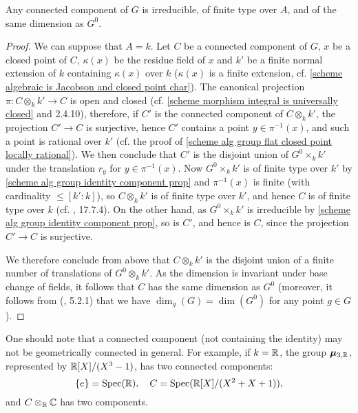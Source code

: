 \begin{corollary}\label{scheme alg group connected component prop}
Any connected component of $G$ is irreducible, of finite type over $A$, and of the same dimension as $G^0$.
\end{corollary}
\begin{proof}
We can suppose that $A=k$. Let $C$ be a connected component of $G$, $x$ be a closed point of $C$, $\kappa(x)$ be the residue field of $x$ and $k'$ be a finite normal extension of $k$ containing $\kappa(x)$ over $k$ ($\kappa(x)$ is a finite extension, cf. \cref{scheme algebraic is Jacobson and closed point char}). The canonical projection $\pi:C\otimes_kk'\to C$ is open and closed (cf. \cref{scheme morphism integral is universally closed} and \cite{EGA4-2} 2.4.10), therefore, if $C'$ is the connected component of $C\otimes_kk'$, the projection $C'\to C$ is  surjective, hence $C'$ contains a point $y\in\pi^{-1}(x)$, and such a point is rational over $k'$ (cf. the proof of \cref{scheme alg group flat closed point locally rational}). We then conclude that $C'$ is the disjoint union of $G^0\times_kk'$ under the translation $r_y$ for $y\in\pi^{-1}(x)$. Now $G^0\times_kk'$ is of finite type over $k'$ by \cref{scheme alg group identity component prop} and $\pi^{-1}(x)$ is finite (with cardinality $\leq[k':k]$), so $C\otimes_kk'$ is of finite type over $k'$, and hence $C$ is of finite type over $k$ (cf. \cite{EGA4-4}, 17.7.4). On the other hand, as $G^0\times_kk'$ is irreducible by \cref{scheme alg group identity component prop}, so is $C'$, and hence is $C$, since the projection $C'\to C$ is surjective.\par
We therefore conclude from above that $C\otimes_kk'$ is the disjoint union of a finite number of translations of $G^0\otimes_kk'$. As the dimension is invariant under base change of fields, it follows that $C$ has the same dimension as $G^0$ (moreover, it follows from (\cite{EGA4-2}, 5.2.1) that we have $\dim_g(G)=\dim(G^0)$ for any point $g\in G$).
\end{proof}

\begin{example}\label{scheme A-group connected component not geometrically irreducible example}
One should note that a connected component (not containing the identity) may not be geometrically connected in general. For example, if $k=\mathbb{R}$, the group $\bm{\mu}_{3,\mathbb{R}}$, represented by $\mathbb{R}[X]/(X^3-1)$, has two connected components:
\[\{e\}=\mathrm{Spec}(\mathbb{R}),\quad C=\mathrm{Spec}(\mathbb{R}[X]/(X^2+X+1)),\]
and $C\otimes_{\mathbb{R}}\mathbb{C}$ has two components. 
\end{example}

